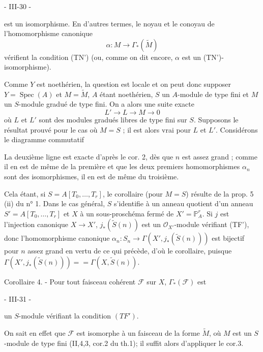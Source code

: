 \newpage


- III-30 -

est un isomorphisme. En d'autres termes, le noyau et le conoyau
de l'homomorphisme canonique
$$\alpha : M \to \Gamma_*( \tilde{M} )$$
vérifient la condition (TN') (ou, comme on dit encore, $\alpha$ est
un (TN')-isomorphisme).

Comme $Y$ est noethérien, la question est locale et on peut donc
supposer $Y = \operatorname{Spec}(A)$ et $M = \tilde{M}$, $A$ étant noethérien, $S$ un $A$-module de type fini et $M$ un $S$-module gradué de type fini. On a alors
une suite exacte
$$L' \to L \to M \to 0$$
où $L$ et $L'$ sont des modules gradués libres de type fini sur $S$. Supposons le résultat prouvé pour le cas où $M=S$ ; il est alors vrai pour $L$ et $L'$. Considérons le diagramme commutatif
La deuxième ligne est exacte d'après le cor. 2, dès que $n$ est assez
grand ; comme il en est de même de la première et que les deux premiers homomorphismes $\alpha_n$ sont des isomorphismes, il en est de même
du troisième.

Cela étant, si $S = A[T_0, \dots, T_r]$, le corollaire (pour $M=S$) résulte
de la prop. 5 (ii) du n° 1. Dans le cas général, $S$ s'identifie à un
anneau quotient d'un anneau $S' = A[T_0, \dots, T_r]$ et $X$ à un sous-proschéma
fermé de $X' = \mathbb{P}^r_A$. Si $j$ est l'injection canonique $X \to X'$, $j_*(\tilde{S}(n))$ est
un $\mathcal{O}_{X'}$-module vérifiant (TF'), donc l'homomorphisme canonique
$\alpha_n : S_n \to \Gamma(X', j_*(\tilde{S}(n)))$ est bijectif pour $n$ assez grand en vertu
de ce qui précède, d'où le corollaire, puisque $\Gamma(X', j_*(\tilde{S}(n))) =
= \Gamma(X, \tilde{S}(n))$.

Corollaire 4. - Pour tout faisceau cohérent $\mathcal{F}$ sur $X$, $\Gamma_*( \mathcal{F} )$ est

\newpage


- III-31 -

un $S$-module vérifiant la condition $(TF')$.

On sait en effet que $\mathcal{F}$ est isomorphe à un faisceau de la forme $\widetilde{M}$, où $M$ est un $S$-module de type fini (II,4,3, cor.2 du th.1); il suffit alors d'appliquer le cor.3.


